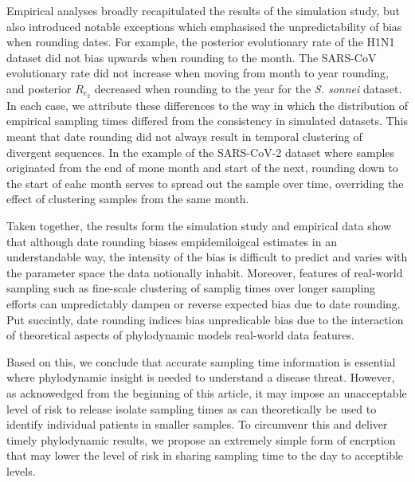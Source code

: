 \documentclass{article}
\begin{document}
\begin{spacing}{1.5}
Empirical analyses broadly recapitulated the results of the simulation study, but also introduced notable exceptions which emphasised the unpredictability of bias when rounding dates. For example, the posterior evolutionary rate of the H1N1 dataset did not bias upwards when rounding to the month. The SARS-CoV evolutionary rate did not increase when moving from month to year rounding, and posterior $R_{e_2}$ decreased when rounding to the year for the \textit{S. sonnei} dataset. In each case, we attribute these differences to the way in which the distribution of empirical sampling times differed from the consistency in simulated datasets. This meant that date rounding did not always result in temporal clustering of divergent sequences. In the example of the SARS-CoV-2 dataset where samples originated from the end of mone month and start of the next, rounding down to the start of eahc month serves to spread out the sample over time, overriding the effect of clustering samples from the same month.

Taken together, the results form the simulation study and empirical data show that although date rounding biases empidemiloigcal estimates in an understandable way, the intensity of the bias is difficult to predict and varies with the parameter space the data notionally inhabit. Moreover, features of real-world sampling such as fine-scale clustering of samplig times over longer sampling efforts can unpredictably dampen or reverse expected bias due to date rounding. Put succintly, date rounding indices bias unpredicable bias due to the interaction of theoretical aspects of phylodynamic models real-world data features.

Based on this, we conclude that accurate sampling time information is essential where phylodynamic insight is needed to understand a disease threat. However, as acknowedged from the beginning of this article, it may impose an unacceptable level of risk to release isolate sampling times as can theoretically be used to identify individual patients in smaller samples. To circumvenr this and deliver timely phylodynamic results, we propose an extremely simple form of encrption that may lower the level of risk in sharing sampling time to the day to acceptible levels.


\end{spacing}
\end{document}
